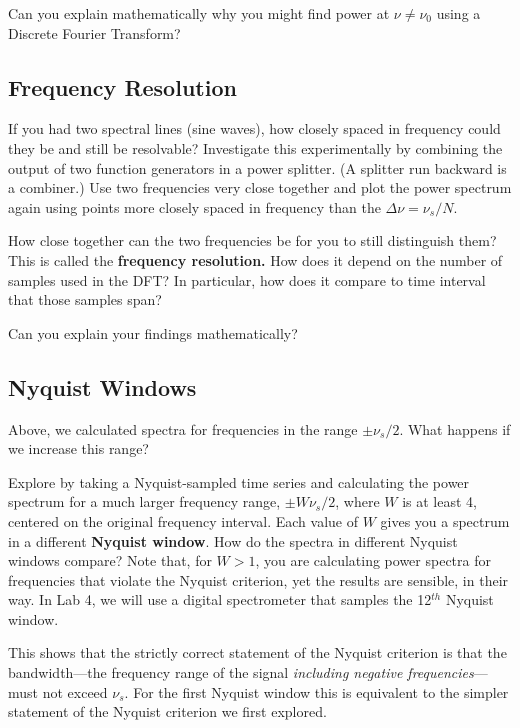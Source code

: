 \documentclass[11pt,preprint]{aastex}
\begin{document}
Can you explain mathematically why you might find power at $\nu\ne\nu_0$ using a Discrete Fourier Transform?

\subsection{Frequency Resolution} \label{freqres}

\noindent
If you had two spectral lines (sine waves), how closely spaced in frequency
could they be and still be resolvable? Investigate this experimentally by
combining the output of two function generators in a power splitter. (A splitter
run backward is a combiner.) Use two 
frequencies very close together and plot the power spectrum again
using points more closely spaced in frequency
than the $\Delta \nu = \nu_s/N$.

How close together can the two frequencies be for you to still 
distinguish them? This is called the {\bf frequency resolution.} How
does it depend on the number of samples used in the DFT? In
particular, how does it compare to time interval that
those samples span?

Can you explain your findings mathematically?

\subsection{Nyquist Windows}

\noindent
Above, we calculated spectra for frequencies in the range $\pm
\nu_s/2$. What happens if we increase this range?

Explore by
taking a Nyquist-sampled time series and calculating the power
spectrum for a much larger frequency range, $\pm W \nu_s/2$, where
$W$ is at least 4, centered on the original frequency interval. Each value
of $W$ gives you a spectrum in a different {\bf Nyquist window}. How do
the spectra in different Nyquist windows compare? Note that, for $W>1$,
you are calculating power spectra for frequencies that violate the
Nyquist criterion, yet the results are sensible, in their way. 
In Lab 4, we will use a digital spectrometer that samples the
12$^{th}$ Nyquist window.

This shows that the strictly correct statement of the Nyquist criterion
is that the bandwidth---the frequency range of the
signal {\it including negative frequencies}---must not exceed $\nu_s$. For the first Nyquist window this
is equivalent to the simpler statement of the Nyquist criterion we first
explored.
\end{document}
